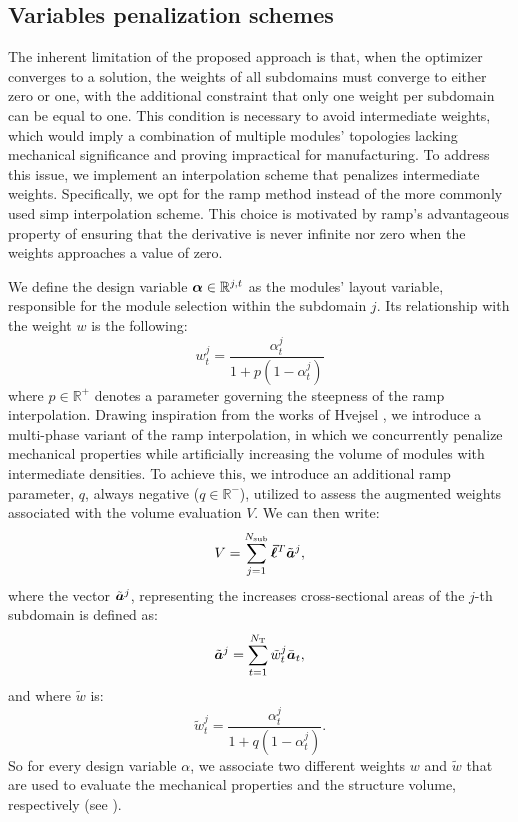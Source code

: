 \subsection{Variables penalization schemes}
The inherent limitation of the proposed approach is that, when the optimizer converges to a solution, the weights of all subdomains must converge to either zero or one, with the additional constraint that only one weight per subdomain can be equal to one. This condition is necessary to avoid intermediate weights, which would imply a combination of multiple modules' topologies lacking mechanical significance and proving impractical for manufacturing. To address this issue, we implement an interpolation scheme that penalizes intermediate weights. Specifically, we opt for the \gls{ramp} method  instead of the more commonly used \gls{simp} interpolation scheme. This choice is motivated by \gls{ramp}'s advantageous property of ensuring that the derivative is never infinite nor zero when the weights approaches a value of zero.

We define the design variable $\bm{\alpha}\in\mathbb{R}^{j,t}$ as the modules' layout variable, responsible for the module selection within the subdomain $j$. Its relationship with the weight $w$ is the following:
\begin{equation}
    w_t^j = \frac{\alpha_t^j}{1+p(1-\alpha_t^j)}    
\end{equation}
where $p \in \mathbb{R}^+$ denotes a parameter governing the steepness of the \gls{ramp} interpolation. Drawing inspiration from the works of Hvejsel \etal {}, we introduce a multi-phase variant of the \gls{ramp} interpolation, in which we concurrently penalize mechanical properties while artificially increasing the volume of modules with intermediate densities. To achieve this, we introduce an additional \gls{ramp} parameter, $q$, always negative ($q \in \mathbb{R}^-$), utilized to assess the augmented weights associated with the volume evaluation $V$. We can then write:
\begin{equation}
    V = \sum_{j=1}^{N_{\text{sub}}}\bm{\bar{\ell}}^T\tilde{\bm{a}}^j,
\end{equation}
where the vector $\tilde{\bm{a}}^j$, representing the increases cross-sectional areas of the $j$-th subdomain is defined as:
\begin{equation}
    \tilde{\bm{a}}^j = \sum_{t=1}^{N_\text{T}} \tilde{w}_t^j \bar{\bm{a}}_t, 
\end{equation}
and where $\tilde{w}$ is:
\begin{equation}
    \tilde{w}_t^j = \frac{\alpha_t^j}{1+q(1-\alpha_t^j)}.    
\end{equation}
So for every design variable $\alpha$, we associate two different weights $w$ and $\tilde{w}$ that are used to evaluate the mechanical properties and the structure volume, respectively (see ).


